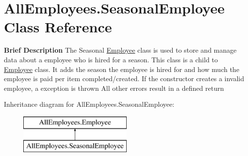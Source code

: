 \hypertarget{class_all_employees_1_1_seasonal_employee}{}\section{All\+Employees.\+Seasonal\+Employee Class Reference}
\label{class_all_employees_1_1_seasonal_employee}


{\bfseries Brief Description} The Seasonal \hyperlink{class_all_employees_1_1_employee}{Employee} class is used to store and manage data about a employee who is hired for a season. This class is a child to \hyperlink{class_all_employees_1_1_employee}{Employee} class. It adds the season the employee is hired for and how much the employee is paid per item completed/created. If the constructor creates a invalid employee, a exception is thrown All other errors result in a defined return  


Inheritance diagram for All\+Employees.\+Seasonal\+Employee\+:\begin{figure}[H]
\begin{center}
\leavevmode
\includegraphics[height=2.000000cm]{class_all_employees_1_1_seasonal_employee}
\end{center}
\end{figure}
